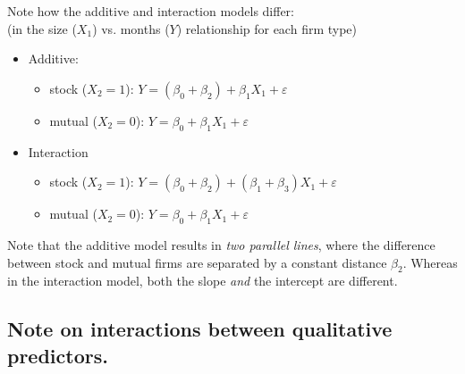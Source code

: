 \documentclass[12pt]{../notes}
\begin{document}
\vspace{2em}

Note how the additive and interaction models differ:\\
(in the size ($X_1$) vs. months ($Y$) relationship for each firm type)
\begin{itemize}
 \item Additive:
  \begin{itemize}
    \item stock ($X_2=1$): $ Y  =  (\beta_0+\beta_2) + \beta_1 X_1 + \varepsilon $
    \item mutual ($X_2=0$): $Y  =  \beta_0 + \beta_1 X_1 + \varepsilon$
  \end{itemize}
 \item Interaction
  \begin{itemize}
    \item stock ($X_2=1$): $ Y  =  (\beta_0+\beta_2) + (\beta_1+\beta_3) X_1 + \varepsilon $
    \item mutual ($X_2=0$): $Y  =  \beta_0 + \beta_1 X_1 + \varepsilon$\\
  \end{itemize}
\end{itemize}

\nspace
Note that the additive model results in \textit{two parallel lines}, where the difference between stock and mutual firms are separated by a constant distance $\beta_2$. Whereas in the interaction model, both the slope \textit{and} the intercept are different. 

\subsection{Note on interactions between qualitative predictors.}



\end{document}

